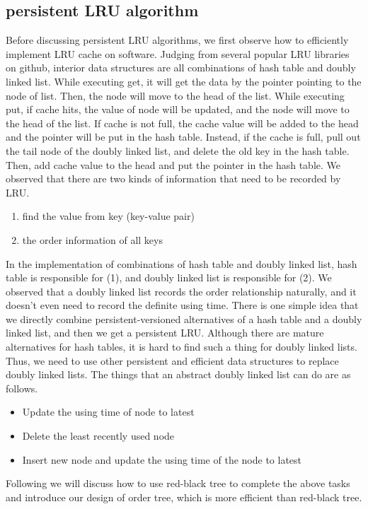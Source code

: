 \documentclass[conference]{IEEEtran}
\begin{document}
\subsection{persistent LRU algorithm}
Before discussing persistent LRU algorithms, we first observe how to efficiently implement LRU cache on software. Judging from several popular LRU libraries on github, interior data structures are all combinations of hash table and doubly linked list.
While executing get, it will get the data by the pointer pointing to the node of list. Then, the node will move to the head of the list. While executing put, if cache hits, the value of node will be updated, and the node will move to the head of the list. If cache is not full, the cache value will be added to the head and the pointer will be put in the hash table. Instead, if the cache is full, pull out the tail node of the doubly linked list, and delete the old key in the hash table. Then, add cache value to the head and put the pointer in the hash table.
We observed that there are two kinds of information that need to be recorded by LRU.
\begin{enumerate}
  \item find the value from key (key-value pair)
  \item the order information of all keys
\end{enumerate}
In the implementation of combinations of hash table and doubly linked list, hash table is responsible for (1), and doubly linked list is responsible for (2). We observed that a doubly linked list records the order relationship naturally, and it doesn't even need to record the definite using time.
There is one simple idea that we directly combine persistent-versioned alternatives of a hash table and a doubly linked list, and then we get a persistent LRU. Although there are mature alternatives for hash tables, it is hard to find such a thing for doubly linked lists.
Thus, we need to use other persistent and efficient data structures to replace doubly linked lists. The things that an abstract doubly linked list can do are as follows.
\begin{itemize}
\item Update the using time of node to latest
\item Delete the least recently used node
\item Insert new node and update the using time of the node to latest
\end{itemize}
Following we will discuss how to use red-black tree to complete the above tasks and introduce our design of order tree, which is more efficient than red-black tree.
\end{document}
